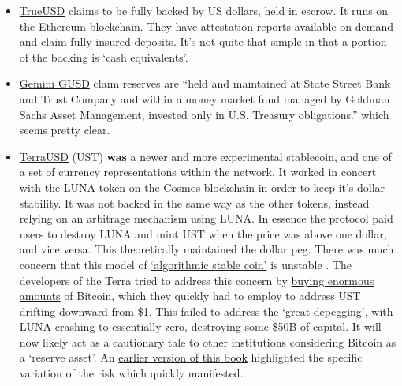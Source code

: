 \begin{itemize}
\item \href{https://trueusd.com/pdf/TUSD_WhitePaper.pdf}{TrueUSD} claims to be fully backed by US dollars, held in escrow. It runs on the Ethereum blockchain. They have attestation reports \href{https://real-time-attest.trustexplorer.io/truecurrencies}{available on demand} and claim fully insured deposits. It's not quite that simple in that a portion of the backing is `cash equivalents'.
\item \href{https://www.gemini.com/static/dollar/gemini-dollar-whitepaper.pdf}{Gemini GUSD} claim reserves are ``held and maintained at State Street Bank and Trust Company and within a money market fund managed by Goldman Sachs Asset Management, invested only in U.S. Treasury obligations.'' which seems pretty clear.
\item \href{https://assets.website-files.com/611153e7af981472d8da199c/618b02d13e938ae1f8ad1e45_Terra_White_paper.pdf}{TerraUSD} (UST) \textbf{was} a newer and more experimental stablecoin, and one of a set of currency representations within the network. It worked in concert with the LUNA token on the Cosmos blockchain in order to keep it's dollar stability. It was not backed in the same way as the other tokens, instead relying on an arbitrage mechanism using LUNA. In essence the protocol paid users to destroy LUNA and mint UST when the price was above one dollar, and vice versa. This theoretically maintained the dollar peg. There was much concern that this model of \href{https://mirror.xyz/damsondao.eth/OVeBrmrfcWm7uKLlA2Q4W1XTVkFU3cMKfNWhgf7mQuM}{`algorithmic stable coin'} is unstable \cite{clements2021built}. The developers of the Terra tried to address this concern by \href{https://etherscan.io/address/0xad41bd1cf3fd753017ef5c0da8df31a3074ea1ea}{buying enormous amounts} of Bitcoin, which they quickly had to employ to address UST drifting downward from \$1. This failed to address the `great depegging', with LUNA crashing to essentially zero, destroying some \$50B of capital. It will now likely act as a cautionary tale to other institutions considering Bitcoin as a `reserve asset'. An \href{https://github.com/GMCyberFoundry/Metaverse/blob/b06547bf290392d2ff02e5142dae7386d888a9de/Book/04_money.tex#L186}{earlier version of this book} highlighted the specific variation of the risk which quickly manifested.

\end{itemize}
